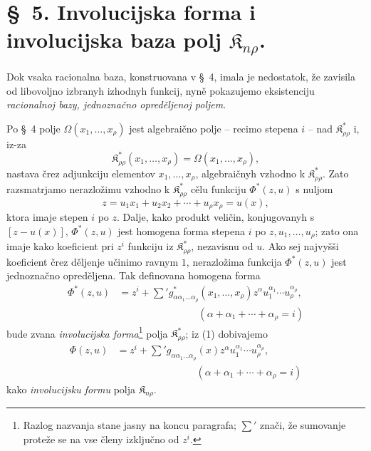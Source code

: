 \documentclass[11pt]{article}
\providecommand{\Kfield}{\mathfrak{K}}
\begin{document}
\section*{\S\ 5. Involucijska forma i involucijska baza polj $\Kfield_{n\rho}$.}

Dok vsaka racionalna baza, konstruovana v \S\ 4, imala je nedostatok, že zavisila od libovoljno izbranyh izhodnyh funkcij, nyně pokazujemo eksistenciju {\itshape racionalnoj bazy, jednoznačno opreděljenoj poljem}.

Po \S\ 4 polje $\Omega(x_1,\ldots,x_\rho)$ jest algebraično polje -- recimo stepena $i$ -- nad $\Kfield^*_{\rho\rho}$ i, iz-za
\[
  \Kfield^*_{\rho\rho}(x_1,
  \ldots,x_\rho)=\Omega(x_1,\ldots,x_\rho),
\]
nastava črez adjunkciju elementov $x_1,\ldots,x_\rho$, algebraičnyh vzhodno k $\Kfield^*_{\rho\rho}$. Zato razsmatrjamo nerazložimu vzhodno k $\Kfield^*_{\rho\rho}$ cělu funkciju $\Phi^*(z,u)$ s nuljom
\[
  z=u_1x_1+u_2x_2+\cdots+u_\rho x_\rho=u(x),
\]
ktora imaje stepen $i$ po $z$. Dalje, kako produkt veličin, konjugovanyh s $[z-u(x)]$, $\Phi^*(z,u)$ jest homogena forma stepena $i$ po $z,u_1,\ldots,u_\rho$; zato ona imaje kako koeficient pri $z^i$ funkciju iz $\Kfield^*_{\rho\rho}$, nezavisnu od $u$. Ako sej najvyšši koeficient črez děljenje učinimo ravnym $1$, nerazložima funkcija $\Phi^*(z,u)$ jest jednoznačno opreděljena. Tak definovana homogena forma
\begin{equation}
\begin{aligned}
  \Phi^*(z,u)
  &=z^i+
    \sum{}' g^*_{\alpha\alpha_1\ldots\alpha_\rho}(x_1,
    \ldots,x_\rho)
    z^\alpha u_1^{\alpha_1}\cdots u_\rho^{\alpha_\rho},\\
  &\hspace{8em}(\alpha+\alpha_1+\cdots+\alpha_\rho=i)
\end{aligned}
\tag{1}
\end{equation}
bude zvana {\itshape involucijska forma}\footnote{Razlog nazvanja stane jasny na koncu paragrafa; $\sum'$ znači, že sumovanje proteže se na vse členy izključno od $z^i$.} polja $\Kfield^*_{\rho\rho}$; iz (1) dobivajemo
\begin{equation}
\begin{aligned}
  \Phi(z,u)
  &=z^i+
    \sum{}' g_{\alpha\alpha_1\ldots\alpha_\rho}(x)
    z^\alpha u_1^{\alpha_1}\cdots u_\rho^{\alpha_\rho},\\
  &\hspace{8em}(\alpha+\alpha_1+\cdots+\alpha_\rho=i)
\end{aligned}
\tag{2}
\end{equation}
kako {\itshape involucijsku formu} polja $\Kfield_{n\rho}$.
\end{document}
